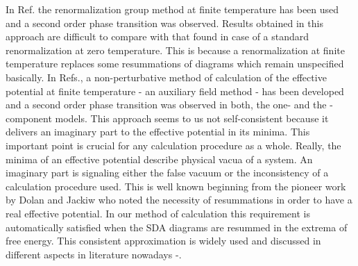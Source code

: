\documentclass[a4paper,12pt]{article}
\begin{document}
In Ref.\cite{Elmfors} the renormalization group method at finite
temperature has been used and a second order phase transition was
observed. Results obtained in this approach are difficult to compare
with that found in case of a standard renormalization at zero
temperature. This is because a renormalization at finite temperature
replaces some resummations of diagrams which remain unspecified
basically. In Refs.\cite{Ogure1}, \cite{Ogure2} a non-perturbative
method of calculation of the effective potential at finite temperature
- an auxiliary field method - has been developed and a second order
phase transition was observed in both, the one- and the \coordHE{}-component
models. This approach seems to us not self-consistent because it
delivers an imaginary part to the effective potential in its
minima. This important point is crucial for any calculation procedure
as a whole. Really, the minima of an effective potential describe
physical vacua of a system. An imaginary part is signaling either the
false vacuum or the inconsistency of a calculation procedure
used. This is well known beginning from the pioneer work by Dolan and
Jackiw \cite{Dolan} who noted the necessity of resummations in order
to have a real effective potential. In our method of calculation this
requirement is automatically satisfied when the SDA diagrams are
resummed in the extrema of free energy. This consistent approximation
is widely used and discussed in different aspects in literature
nowadays \cite{Drummond1}-\cite{Peshier}.
\end{document}
